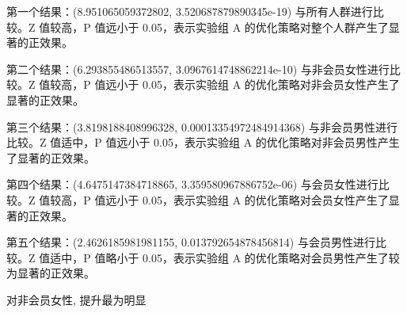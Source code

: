 \documentclass[a4paper]{article}
\begin{document}
第一个结果：(8.951065059372802, 3.520687879890345e-19) 与所有人群进行比较。Z 值较高，P 值远小于 0.05，表示实验组 A 的优化策略对整个人群产生了显著的正效果。

第二个结果：(6.293855486513557, 3.0967614748862214e-10) 与非会员女性进行比较。Z 值较高，P 值远小于 0.05，表示实验组 A 的优化策略对非会员女性产生了显著的正效果。

第三个结果：(3.8198188408996328, 0.00013354972484914368) 与非会员男性进行比较。Z 值适中，P 值远小于 0.05，表示实验组 A 的优化策略对非会员男性产生了显著的正效果。

第四个结果：(4.6475147384718865, 3.359580967886752e-06) 与会员女性进行比较。Z 值较高，P 值远小于 0.05，表示实验组 A 的优化策略对会员女性产生了显著的正效果。

第五个结果：(2.4626185981981155, 0.013792654878456814) 与会员男性进行比较。Z 值适中，P 值略小于 0.05，表示实验组 A 的优化策略对会员男性产生了较为显著的正效果。

对非会员女性, 提升最为明显
\end{document}
